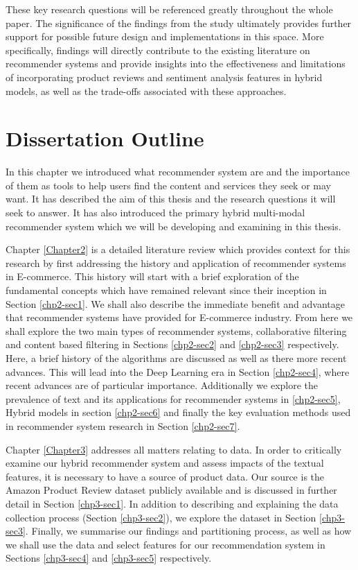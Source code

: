 These key research questions will be referenced greatly throughout the whole paper. The significance of the findings from the study ultimately provides further support for possible future design and implementations in this space. More specifically, findings will directly contribute to the existing literature on recommender systems and provide insights into the effectiveness and limitations of incorporating product reviews and sentiment analysis features in hybrid models, as well as the trade-offs associated with these approaches.


\section{Dissertation Outline}
\label{chp1-sec4}

In this chapter we introduced what recommender system are and the importance of them as tools to help users find the content and services they seek or may want. It has described the aim of this thesis and the research questions it will seek to answer. It has also introduced the primary hybrid multi-modal recommender system which we will be developing and examining in this thesis.

Chapter \ref{Chapter2} is a detailed literature review which provides context for this research by first addressing the history and application of recommender systems in E-commerce. This history will start with a brief exploration of the fundamental concepts which have remained relevant since their inception in Section \ref{chp2-sec1}. We shall also describe the immediate benefit and advantage that recommender systems have provided for E-commerce industry. From here we shall explore the two main types of recommender systems, collaborative filtering and content based filtering in Sections \ref{chp2-sec2} and \ref{chp2-sec3} respectively. Here, a brief history of the algorithms are discussed as well as there more recent advances. This will lead into the Deep Learning era in Section \ref{chp2-sec4}, where recent advances are of particular importance. Additionally we explore the prevalence of text and its applications for recommender systems in \ref{chp2-sec5}, Hybrid models in section \ref{chp2-sec6} and finally the key evaluation methods used in recommender system research in Section \ref{chp2-sec7}. 

Chapter \ref{Chapter3} addresses all matters relating to data. In order to critically examine our hybrid recommender system and assess impacts of the textual features, it is necessary to have a source of product data. Our source is the Amazon Product Review dataset publicly available and is discussed in further detail in Section \ref{chp3-sec1}. In addition to describing and explaining the data collection process (Section \ref{chp3-sec2}), we explore the dataset in Section \ref{chp3-sec3}. Finally, we summarise our findings and partitioning process, as well as how we shall use the data and select features for our recommendation system in Sections \ref{chp3-sec4} and \ref{chp3-sec5} respectively. 

